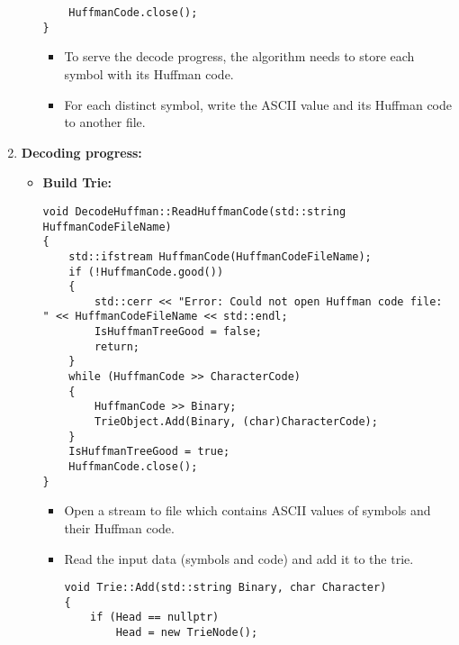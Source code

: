 \begin{enumerate}[label=\textbf{\Alph*.}]
\begin{itemize}
\begin{verbatim}
    HuffmanCode.close();
}
\end{verbatim}
        \begin{itemize}
            \item To serve the decode progress, the algorithm needs to store each symbol with its Huffman code.
            \item For each distinct symbol, write the ASCII value and its Huffman code to another file.
        \end{itemize}
    \end{itemize}
    \newpage
    \item \textbf{Decoding progress:}
    \begin{itemize}
        \item \textbf{Build Trie:}
\begin{verbatim}
void DecodeHuffman::ReadHuffmanCode(std::string HuffmanCodeFileName)
{
    std::ifstream HuffmanCode(HuffmanCodeFileName);
    if (!HuffmanCode.good())
    {
        std::cerr << "Error: Could not open Huffman code file: " << HuffmanCodeFileName << std::endl;
        IsHuffmanTreeGood = false; 
        return;
    }
    while (HuffmanCode >> CharacterCode) 
    {
        HuffmanCode >> Binary;
        TrieObject.Add(Binary, (char)CharacterCode);
    }
    IsHuffmanTreeGood = true;
    HuffmanCode.close();
}
\end{verbatim}
        \begin{itemize}
            \item Open a stream to file which contains ASCII values of symbols and their Huffman code.
            \item Read the input data (symbols and code) and add it to the trie.
\begin{verbatim}
void Trie::Add(std::string Binary, char Character)
{
    if (Head == nullptr) 
        Head = new TrieNode();


\end{verbatim}
\end{itemize}
\end{itemize}
\end{enumerate}
